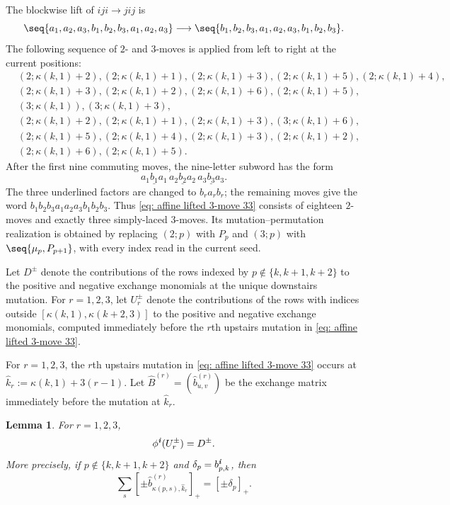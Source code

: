 \documentclass[12pt, leqno]{amsart}
\numberwithin{equation}{section}
\theoremstyle{plain}
\newtheorem{lemma}{Lemma}[section]
\theoremstyle{definition}
\newcommand{\seteq}{\mathbin{:=}}
\newcommand{\ii}{ \textbf{\textit{i}}}
\newcommand{\hB}{\widehat{B}}
\newcommand{\hb}{\widehat{b}}
\newcommand{\hk}{\widehat{k}}
\begin{document}
The blockwise lift of $iji\longrightarrow jij$ is
\[
 \seq{a_1,a_2,a_3,b_1,b_2,b_3,a_1,a_2,a_3}
 \longrightarrow
 \seq{b_1,b_2,b_3,a_1,a_2,a_3,b_1,b_2,b_3}.
\]
 The following sequence of $2$- and $3$-moves is applied from
left to right at the current positions:{}
\begin{equation}
\label{eq: affine lifted 3-move 33}
\begin{aligned}
 &(2;\kappa(k,1)+2),(2;\kappa(k,1)+1),(2;\kappa(k,1)+3),(2;\kappa(k,1)+5),(2;\kappa(k,1)+4),\\
 &(2;\kappa(k,1)+3),(2;\kappa(k,1)+2),(2;\kappa(k,1)+6),(2;\kappa(k,1)+5),\\
 &(3;\kappa(k,1)),(3;\kappa(k,1)+3),\\
 &(2;\kappa(k,1)+2),(2;\kappa(k,1)+1),(2;\kappa(k,1)+3),(3;\kappa(k,1)+6),\\
 &(2;\kappa(k,1)+5),(2;\kappa(k,1)+4),(2;\kappa(k,1)+3),(2;\kappa(k,1)+2), \\
 &(2;\kappa(k,1)+6),(2;\kappa(k,1)+5).
\end{aligned}
\end{equation}
After the first nine commuting moves,   the nine-letter subword has the form  \[
 \underline{a_1b_1a_1}\,
 \underline{a_2b_2a_2}\,
 \underline{a_3b_3a_3}.
\]
The three underlined factors are changed to $b_ra_rb_r$; the remaining
moves  give the word\linebreak
$b_1b_2b_3a_1a_2a_3b_1b_2b_3$.  Thus
\eqref{eq: affine lifted 3-move 33} consists of eighteen $2$-moves and
exactly three simply-laced $3$-moves.  Its mutation--permutation
realization is obtained by replacing $(2;p)$ with $P_p$ and $(3;p)$
with $\seq{\mu_p,P_{p+1}}$, with every index read in the current
seed.

Let $D^\pm$ denote the contributions of the rows indexed by
$p\notin\{k,k+1,k+2\}$ to the positive and negative exchange
monomials at the unique downstairs mutation.
For $r=1,2,3$, let $U_r^\pm$ denote the contributions of the rows
with indices outside $[\kappa(k,1),\kappa(k+2,3)]$ to the positive
and negative exchange monomials, computed immediately before
the $r$th upstairs mutation in \eqref{eq: affine lifted 3-move 33}.

For $r=1,2,3$, the $r$th upstairs mutation in
\eqref{eq: affine lifted 3-move 33} occurs at
$\hk_r\seteq\kappa(k,1)+3(r-1)$.
Let $\hB^{(r)}=(\hb^{(r)}_{u,v})$ be the exchange matrix
immediately before the mutation at $\hk_r$.

\begin{lemma}
\label{lem: coefficient folding three move 33}
For $r=1,2,3$,
\[
 \phi^\ii(U_r^\pm)=D^\pm.
\]
More precisely, if   $p\notin\{k,k+1,k+2\}$  and
$\delta_p=b^\ii_{p,k}$,
then 
\[
 \sum_s[\mathord\pm \hb^{(r)}_{\kappa(p,s),\hk_r}]_+
   =[\mathord\pm\delta_p]_+.
\]
\end{lemma}
\end{document}
